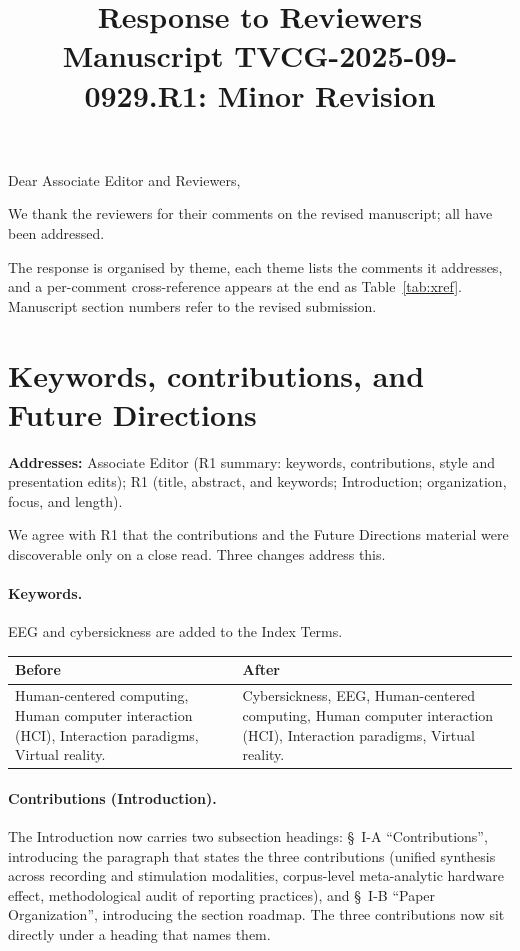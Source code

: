 \documentclass[11pt,a4paper]{article}
\title{\vspace{-2em}Response to Reviewers\\[0.3em]
  \large Manuscript TVCG-2025-09-0929.R1: Minor Revision}
\author{}
\date{}
\makeatletter
\newcommand{\diffbox}[2]{%
  \begin{center}
  \small
  \begin{tabular}{@{}p{0.46\textwidth}@{\hspace{2em}}p{0.46\textwidth}@{}}
  \toprule
  \textbf{Before} & \textbf{After} \\
  \midrule
  #1 & #2 \\
  \bottomrule
  \end{tabular}
  \end{center}}
\newcommand{\addresses}[1]{\par\noindent\textbf{\small Addresses:} {\small #1}\par\smallskip}
\makeatother
\begin{document}
\maketitle
\vspace{-3em}

\noindent Dear Associate Editor and Reviewers,\medskip

\noindent We thank the reviewers for their comments on the revised manuscript; all have been addressed.

\noindent The response is organised by theme, each theme lists the comments it addresses, and a per-comment cross-reference appears at the end as Table~\ref{tab:xref}. Manuscript section numbers refer to the revised submission.

\bigskip

\section{Keywords, contributions, and Future Directions}\label{sec:signpost}
\addresses{Associate Editor (R1 summary: keywords, contributions, style and presentation edits); R1 (title, abstract, and keywords; Introduction; organization, focus, and length).}

We agree with R1 that the contributions and the Future Directions material were discoverable only on a close read. Three changes address this.

\paragraph{Keywords.} EEG and cybersickness are added to the Index Terms.

\diffbox{Human-centered computing, Human computer interaction (HCI), Interaction paradigms, Virtual reality.}{Cybersickness, EEG, Human-centered computing, Human computer interaction (HCI), Interaction paradigms, Virtual reality.}

\paragraph{Contributions (Introduction).} The Introduction now carries two subsection headings: \S~I-A ``Contributions'', introducing the paragraph that states the three contributions (unified synthesis across recording and stimulation modalities, corpus-level meta-analytic hardware effect, methodological audit of reporting practices), and \S~I-B ``Paper Organization'', introducing the section roadmap. The three contributions now sit directly under a heading that names them.
\end{document}
